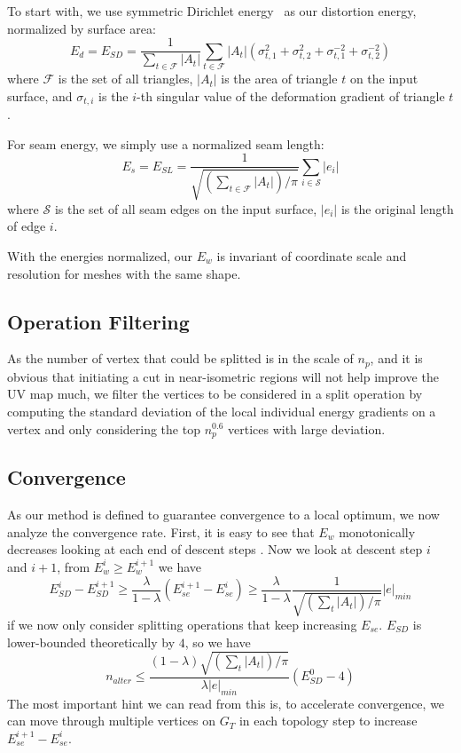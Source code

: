 To start with, we use symmetric Dirichlet energy~\cite{Smith2015Bijective} as our distortion energy, normalized by surface area:
\[ E_d = E_{SD} = \frac{1}{\sum_{t\in\mathcal{F}} |A_t|} \sum_{t\in\mathcal{F}} |A_t|(\sigma_{t,1}^2 + \sigma_{t,2}^2 + \sigma_{t,1}^{-2} + \sigma_{t,2}^{-2}) \]
where $\mathcal{F}$ is the set of all triangles, $|A_t|$ is the area of triangle $t$ on the input surface, and $\sigma_{t,i}$ is the $i$-th singular value of the deformation gradient of triangle $t$.

For seam energy, we simply use a normalized seam length:
\[ E_s = E_{SL} = \frac{1}{\sqrt{(\sum_{t\in\mathcal{F}} |A_t|)/\pi}} \sum_{i \in \mathcal{S}} |e_i| \]
where $\mathcal{S}$ is the set of all seam edges on the input surface, $|e_i|$ is the original length of edge $i$.

With the energies normalized, our $E_w$ is invariant of coordinate scale and resolution for meshes with the same shape.





\subsection{Operation Filtering}
\label{sec:operationFiltering}
As the number of vertex that could be splitted is in the scale of $n_p$, and it is obvious that initiating a cut in near-isometric regions will not help improve the UV map much, we filter the vertices to be considered in a split operation by computing the standard deviation of the local individual energy gradients on a vertex and only considering the top $n_p^{0.6}$ vertices with large deviation. 

\subsection{Convergence}
\label{sec:convergence}

As our method is defined to guarantee convergence to a local optimum, we now analyze the convergence rate. First, it is easy to see that $E_w$ monotonically decreases  looking at each end of descent steps . Now we look at descent step $i$ and $i+1$, from $E^i_w \geq E^{i+1}_w$ we have
\[ E^i_{SD} - E^{i+1}_{SD} \geq \frac{\lambda}{1-\lambda} (E^{i+1}_{se} - E^i_{se}) \geq \frac{\lambda}{1-\lambda} \frac{1}{\sqrt{(\sum_t |A_t|)/\pi}} |e|_{min} \]
if we now only consider splitting operations that keep increasing $E_{se}$. $E_{SD}$ is lower-bounded theoretically by $4$, so we have
\[ n_{alter} \leq \frac{(1-\lambda)\sqrt{(\sum_t |A_t|)/\pi}}{\lambda|e|_{min}} (E^0_{SD} - 4) \]
The most important hint we can read from this is, to accelerate convergence, we can move through multiple vertices on $G_T$ in each topology step to increase $E^{i+1}_{se} - E^i_{se}$.

